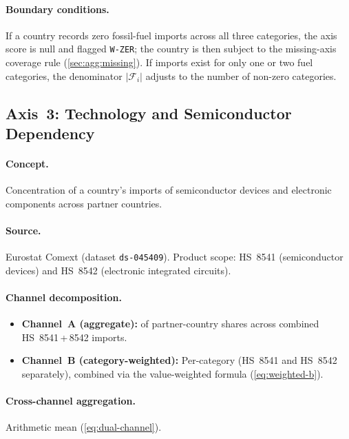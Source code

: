 \paragraph{Boundary conditions.}
If a country records zero fossil-fuel imports across all three categories,
the axis score is null and flagged \texttt{W-ZER}; the country is then
subject to the missing-axis coverage rule (\cref{sec:agg:missing}).  If
imports exist for only one or two fuel categories, the denominator
\(|\mathcal{F}_i|\) adjusts to the number of non-zero categories.

\subsection{Axis~3: Technology and Semiconductor Dependency}%
\label{sec:axis:technology}

\paragraph{Concept.}
Concentration of a country's imports of semiconductor devices and
electronic components across partner countries.

\paragraph{Source.}
Eurostat Comext (dataset \texttt{ds-045409}).  Product scope: HS~8541
(semiconductor devices) and HS~8542 (electronic integrated circuits).

\paragraph{Channel decomposition.}
\begin{itemize}
  \item \textbf{Channel~A (aggregate):}  \HHI of partner-country
    shares across combined HS~8541\,+\,8542 imports.
  \item \textbf{Channel~B (category-weighted):}  Per-category \HHI
    (HS~8541 and HS~8542 separately), combined via the value-weighted
    formula (\cref{eq:weighted-b}).
\end{itemize}

\paragraph{Cross-channel aggregation.}
Arithmetic mean (\cref{eq:dual-channel}).

